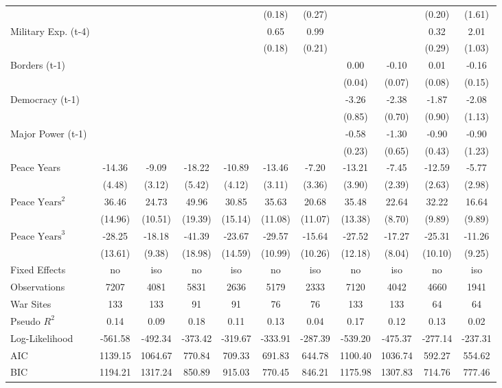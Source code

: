 \begin{tabular}{lcccccccccc}
&  &  &  &  & (0.18) & (0.27) &  &  & (0.20) & (1.61) \\
Military Exp. (t-4) &  &  &  &  & 0.65 & 0.99 &  &  & 0.32 & 2.01 \\
&  &  &  &  & (0.18) & (0.21) &  &  & (0.29) & (1.03) \\
Borders (t-1) &  &  &  &  &  &  & 0.00 & -0.10 & 0.01 & -0.16 \\
&  &  &  &  &  &  & (0.04) & (0.07) & (0.08) & (0.15) \\
Democracy (t-1) &  &  &  &  &  &  & -3.26 & -2.38 & -1.87 & -2.08 \\
&  &  &  &  &  &  & (0.85) & (0.70) & (0.90) & (1.13) \\
Major Power (t-1) &  &  &  &  &  &  & -0.58 & -1.30 & -0.90 & -0.90 \\
&  &  &  &  &  &  & (0.23) & (0.65) & (0.43) & (1.23) \\
Peace Years & -14.36 & -9.09 & -18.22 & -10.89 & -13.46 & -7.20 & -13.21 & -7.45 & -12.59 & -5.77 \\
& (4.48) & (3.12) & (5.42) & (4.12) & (3.11) & (3.36) & (3.90) & (2.39) & (2.63) & (2.98) \\
$\text{Peace Years}^2$ & 36.46 & 24.73 & 49.96 & 30.85 & 35.63 & 20.68 & 35.48 & 22.64 & 32.22 & 16.64 \\
& (14.96) & (10.51) & (19.39) & (15.14) & (11.08) & (11.07) & (13.38) & (8.70) & (9.89) & (9.89) \\
$\text{Peace Years}^3$ & -28.25 & -18.18 & -41.39 & -23.67 & -29.57 & -15.64 & -27.52 & -17.27 & -25.31 & -11.26 \\
& (13.61) & (9.38) & (18.98) & (14.59) & (10.99) & (10.26) & (12.18) & (8.04) & (10.10) & (9.25) \\
\midrule
Fixed Effects & no & iso & no & iso & no & iso & no & iso & no & iso \\
Observations & 7207 & 4081 & 5831 & 2636 & 5179 & 2333 & 7120 & 4042 & 4660 & 1941 \\
War Sites & 133 & 133 & 91 & 91 & 76 & 76 & 133 & 133 & 64 & 64 \\
Pseudo $R^2$ & 0.14 & 0.09 & 0.18 & 0.11 & 0.13 & 0.04 & 0.17 & 0.12 & 0.13 & 0.02 \\
Log-Likelihood & -561.58 & -492.34 & -373.42 & -319.67 & -333.91 & -287.39 & -539.20 & -475.37 & -277.14 & -237.31 \\
AIC & 1139.15 & 1064.67 & 770.84 & 709.33 & 691.83 & 644.78 & 1100.40 & 1036.74 & 592.27 & 554.62 \\
BIC & 1194.21 & 1317.24 & 850.89 & 915.03 & 770.45 & 846.21 & 1175.98 & 1307.83 & 714.76 & 777.46 \\
\bottomrule
\end{tabular}
